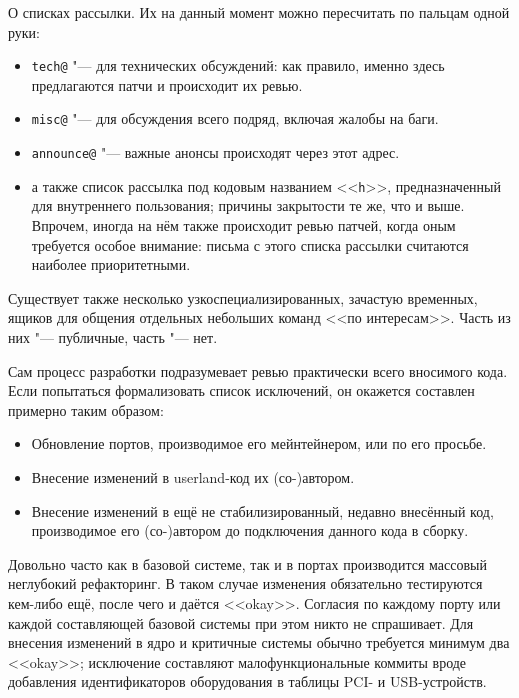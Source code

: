 \documentclass[10pt, a5paper]{article}
\begin{document}
О списках рассылки. Их на данный момент можно пересчитать по пальцам одной руки:
\begin{itemize}
  \item \verb!tech@! "--- для технических обсуждений: как правило, именно здесь предлагаются патчи и происходит их ревью.

  \item \verb!misc@! "--- для обсуждения всего подряд, включая жалобы на баги.

  \item \verb!announce@! "--- важные анонсы происходят через этот адрес.

  \item а также список рассылка под кодовым названием <<\verb!h!>>, предназначенный для внутреннего пользования; причины закрытости те же, что и выше. Впрочем, иногда на нём также происходит ревью патчей, когда оным требуется особое внимание: письма с этого списка рассылки считаются наиболее приоритетными.
\end{itemize}

Существует также несколько узкоспециализированных, зачастую временных, ящиков для общения отдельных небольших команд <<по интересам>>. Часть из них "--- публичные, часть "--- нет.

Сам процесс разработки подразумевает ревью практически всего вносимого кода. Если попытаться формализовать список исключений, он окажется составлен примерно таким образом:

\begin{itemize}
  \item Обновление портов, производимое его мейнтейнером, или по его просьбе.

  \item Внесение изменений в userland-код их (со-)автором.

  \item Внесение изменений в ещё не стабилизированный, недавно внесённый код, производимое его (со-)автором до подключения данного кода в сборку.
\end{itemize}

Довольно часто как в базовой системе, так и в портах производится массовый неглубокий рефакторинг. В таком случае изменения обязательно тестируются кем-либо ещё, после чего и даётся <<okay>>. Согласия по каждому порту или каждой составляющей базовой системы при этом никто не спрашивает. Для внесения изменений в ядро и критичные системы обычно требуется минимум два <<okay>>; исключение составляют малофункциональные коммиты вроде добавления идентификаторов оборудования в таблицы PCI- и USB-устройств.
\end{document}
